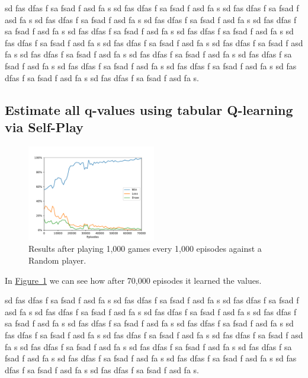 \documentclass{article}
\newcommand{\GithubURL}[1]{[\href{https://github.com/davidrobles/mlnd-capstone-code/blob/master/#1}{source}]}
\begin{document}
sd fas dfas f sa fsad f asd fa s sd fas dfas f sa fsad f asd fa s sd fas dfas f sa fsad f asd fa s
sd fas dfas f sa fsad f asd fa s sd fas dfas f sa fsad f asd fa s sd fas dfas f sa fsad f asd fa s
sd fas dfas f sa fsad f asd fa s sd fas dfas f sa fsad f asd fa s sd fas dfas f sa fsad f asd fa s
sd fas dfas f sa fsad f asd fa s sd fas dfas f sa fsad f asd fa s sd fas dfas f sa fsad f asd fa s
sd fas dfas f sa fsad f asd fa s sd fas dfas f sa fsad f asd fa s sd fas dfas f sa fsad f asd fa s
sd fas dfas f sa fsad f asd fa s sd fas dfas f sa fsad f asd fa s sd fas dfas f sa fsad f asd fa s.

\subsection{Estimate all q-values using tabular Q-learning via Self-Play}


\begin{figure}[!h]
    \centering
    \includegraphics[width=0.50\textwidth]{figures/tic_ql_tab_full_selfplay_wld_plot.pdf}
    \caption{Results after playing 1,000 games every 1,000 episodes against a Random player.}
    \label{fig:tic-ql-tab-full-selfplay-wld-plot}
\end{figure}

In \hyperref[fig:tic-ql-tab-full-selfplay-wld-plot]
{Figure~\ref*{fig:tic-ql-tab-full-selfplay-wld-plot}} we can see how after 70,000 episodes it
learned the values.

sd fas dfas f sa fsad f asd fa s sd fas dfas f sa fsad f asd fa s sd fas dfas f sa fsad f asd fa s
sd fas dfas f sa fsad f asd fa s sd fas dfas f sa fsad f asd fa s sd fas dfas f sa fsad f asd fa s
sd fas dfas f sa fsad f asd fa s sd fas dfas f sa fsad f asd fa s sd fas dfas f sa fsad f asd fa s
sd fas dfas f sa fsad f asd fa s sd fas dfas f sa fsad f asd fa s sd fas dfas f sa fsad f asd fa s
sd fas dfas f sa fsad f asd fa s sd fas dfas f sa fsad f asd fa s sd fas dfas f sa fsad f asd fa s
sd fas dfas f sa fsad f asd fa s sd fas dfas f sa fsad f asd fa s sd fas dfas f sa fsad f asd fa s.
\end{document}
